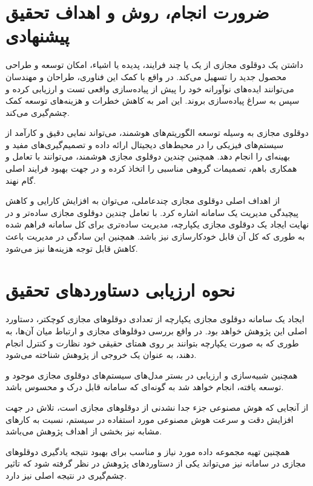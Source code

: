 \documentclass[a4paper,fleqn]{article}
\begin{document}
\section{ضرورت انجام، روش و اهداف تحقیق پیشنهادی}
داشتن یک دوقلوی مجازی از یک یا چند فرایند، پدیده یا اشیاء، امکان توسعه و طراحی محصول جدید را تسهیل می‌کند. در واقع با کمک این فناوری، طراحان و مهندسان می‌توانند ایده‌های نوآورانه خود را پیش از پیاده‌سازی واقعی تست و ارزیابی کرده و سپس به سراغ پیاده‌سازی بروند. این امر به کاهش خطرات و هزینه‌های توسعه کمک چشم‌گیری می‌کند.

دوقلوی مجازی به وسیله توسعه الگوریتم‌های هوشمند، می‌تواند نمایی دقیق و کارآمد از سیستم‌های فیزیکی را در محیط‌های دیجیتال ارائه داده و تصمیم‌گیری‌های مفید و بهینه‌ای را انجام دهد. همچنین چندین دوقلوی مجازی هوشمند، می‌توانند با تعامل و همکاری باهم، تصمیمات گروهی مناسبی را اتخاذ کرده و در جهت بهبود فرایند‌ اصلی گام نهند.

از اهداف اصلی دوقلوی مجازی چندعاملی، می‌توان به افزایش کارایی و کاهش پیچیدگی مدیریت یک سامانه اشاره کرد. با تعامل چندین دوقلوی مجازی ساده‌تر و در نهایت ایجاد یک دوقلوی مجازی یکپارچه، مدیریت ساده‌تری برای کل سامانه فراهم شده به طوری که کل آن قابل خودکارسازی نیز باشد. همچنین این سادگی در مدیریت باعث کاهش قابل‌ توجه هزینه‌ها نیز می‌شود.

\section{نحوه ارزیابی دستاوردهای تحقیق}
ایجاد یک سامانه دوقلوی مجازی یکپارچه از تعدادی دوقلو‌های مجازی کوچکتر، دستاورد اصلی این پژوهش خواهد بود. در واقع بررسی دوقلو‌های مجازی و ارتباط میان آن‌ها، به طوری که به صورت یکپارچه بتوانند بر روی همتای حقیقی خود نظارت و کنترل انجام دهند، به عنوان یک خروجی از پژوهش شناخته می‌شود.

همچنین شبیه‌سازی و ارزیابی در بستر مدل‌های سیستم‌های دوقلو‌ی مجازی موجود و توسعه‌ یافته، انجام خواهد شد به گونه‌ای که سامانه قابل درک و محسوس باشد.

از آنجایی که هوش‌ مصنوعی جزء جدا نشدنی از دوقلو‌های مجازی است، تلاش در جهت افزایش دقت و سرعت هوش مصنوعی مورد استفاده در سیستم، نسبت به کار‌های مشابه نیز بخشی از اهداف پژوهش می‌باشد.

همچنین تهیه مجموعه داده مورد نیاز و مناسب برای بهبود نتیجه یادگیری دوقلو‌های مجازی در سامانه نیز می‌تواند یکی از دستاورد‌های پژوهش در نظر گرفته شود که تاثیر چشم‌گیری در نتیجه اصلی نیز دارد.
\end{document}
